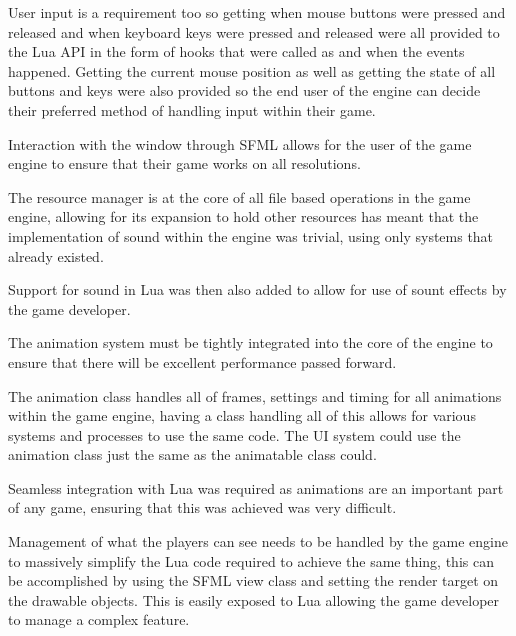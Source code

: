 \documentclass[11pt,a4paper,titlepage]{article}
\begin{document}
    User input is a requirement too so getting when mouse buttons were pressed and released and when keyboard keys were pressed and released were all provided to the Lua API in the form of hooks that were called as and when the events happened. Getting the current mouse position as well as getting the state of all buttons and keys were also provided so the end user of the engine can decide their preferred method of handling input within their game.


   Interaction with the window through SFML allows for the user of the game engine to ensure that their game works on all resolutions.


    The resource manager is at the core of all file based operations in the game engine, allowing for its expansion to hold other resources has meant that the implementation of sound within the engine was trivial, using only systems that already existed. 
    
    Support for sound in Lua was then also added to allow for use of sount effects by the game developer.


    The animation system must be tightly integrated into the core of the engine to ensure that there will be excellent performance passed forward.

    The animation class handles all of frames, settings and timing for all animations within the game engine, having a class handling all of this allows for various systems and processes to use the same code. The UI system could use the animation class just the same as the animatable class could.

    Seamless integration with Lua was required as animations are an important part of any game, ensuring that this was achieved was very difficult.


    Management of what the players can see needs to be handled by the game engine to massively simplify the Lua code required to achieve the same thing, this can be accomplished by using the SFML view class and setting the render target on the drawable objects. This is easily exposed to Lua allowing the game developer to manage a complex feature.
\end{document}
